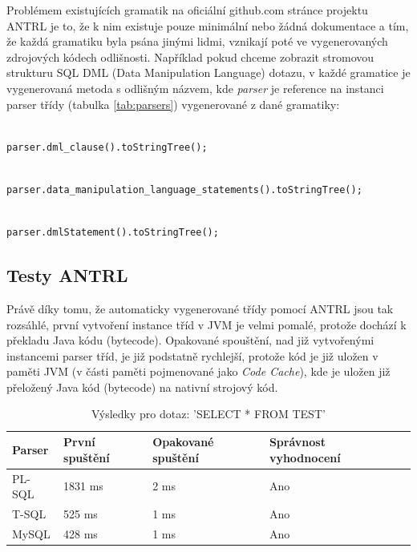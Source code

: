 \documentclass[czech,bachelor,public,dept460,male,cpdeclaration,twoside]{diploma}
\begin{document}
Problémem existujících gramatik na oficiální github.com stránce projektu ANTRL je to, že k nim existuje pouze minimální nebo žádná dokumentace a tím, že každá gramatiku byla psána jinými lidmi, vznikají poté ve vygenerovaných zdrojových kódech odlišnosti. Například pokud chceme zobrazit stromovou strukturu SQL DML (Data Manipulation Language) dotazu, v každé gramatice je vygenerovaná metoda s odlišným názvem, kde \textit{parser} je reference na instanci parser třídy (tabulka \ref{tab:parsers}) vygenerované z dané gramatiky:\newline

\begin{lstlisting}[caption=T-SQL Parser]

parser.dml_clause().toStringTree();
\end{lstlisting}

\begin{lstlisting}[caption=PL-SQL Parser]

parser.data_manipulation_language_statements().toStringTree();
\end{lstlisting}

\begin{lstlisting}[caption=MySQL Parser]

parser.dmlStatement().toStringTree();
\end{lstlisting}

\newpage

\subsection{Testy ANTRL}
Právě díky tomu, že automaticky vygenerované třídy pomocí ANTRL jsou tak rozsáhlé, první vytvoření instance tříd v JVM je velmi pomalé, protože dochází k překladu Java kódu (bytecode). Opakované spouštění, nad již vytvořenými instancemi parser tříd, je již podstatně rychlejší, protože kód je již uložen v paměti JVM (v části paměti pojmenované jako \textit{Code Cache}), kde je uložen již přeložený Java kód (bytecode) na nativní strojový kód.

\begin{table}[!htbp]
	\centering
	\caption{Výsledky pro dotaz: 'SELECT * FROM TEST'}
	\label{tab:antrl1}
	\begin{tabular}{lllll}
		\toprule
		Parser & První spuštění & Opakované spuštění & Správnost vyhodnocení\\
		\midrule
		PL-SQL & 1831 ms & 2 ms & Ano \\
        T-SQL & 525 ms & 1 ms & Ano \\
        MySQL & 428 ms & 1 ms & Ano \\
		\midrule
	\end{tabular}
\end{table}
\end{document}
